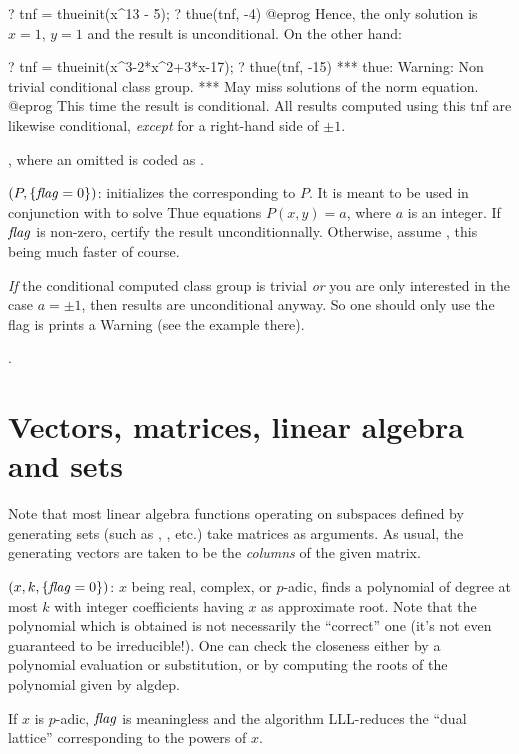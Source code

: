 \bprog
? tnf = thueinit(x^13 - 5);
? thue(tnf, -4)
@eprog
Hence, the only solution is $x = 1$, $y = 1$ and the result is
unconditional. On the other hand:

\bprog
? tnf = thueinit(x^3-2*x^2+3*x-17);
? thue(tnf, -15)
  *** thue: Warning: Non trivial conditional class group.
  *** May miss solutions of the norm equation.
@eprog
This time the result is conditional. All results computed using this tnf
are likewise conditional, \emph{except} for a right-hand side of $\pm 1$.

, where an omitted  is coded
as .

$(P,\{\hbox{\it f\kern0pt lag\/}=0\})$: initializes the 
corresponding to $P$. It is meant to be used in conjunction with 
to solve Thue equations $P(x,y) = a$, where $a$ is an integer. If $\hbox{\it f\kern0pt lag\/}$ is
non-zero, certify the result unconditionnally. Otherwise, assume ,
this being much faster of course.

\emph{If} the conditional computed class group is trivial \emph{or} you are
only interested in the case $a = \pm1$, then results are unconditional
anyway. So one should only use the flag is  prints a Warning (see
the example there).

.

\section{Vectors, matrices, linear algebra and sets}
\label{se:linear_algebra}

Note that most linear algebra functions operating on subspaces defined by
generating sets (such as , , etc.) take matrices as
arguments. As usual, the generating vectors are taken to be the
\emph{columns} of the given matrix.

$(x,k,\{\hbox{\it f\kern0pt lag\/}=0\})$:\label{se:algdep} $x$ being real, complex, or $p$-adic, finds a
polynomial of degree at most $k$ with integer coefficients having $x$ as
approximate root. Note that the polynomial which is obtained is not
necessarily the ``correct'' one (it's not even guaranteed to be
irreducible!). One can check the closeness either by a polynomial evaluation
or substitution, or by computing the roots of the polynomial given by algdep.

If $x$ is $p$-adic, $\hbox{\it f\kern0pt lag\/}$ is meaningless and the algorithm LLL-reduces the
``dual lattice'' corresponding to the powers of $x$.

